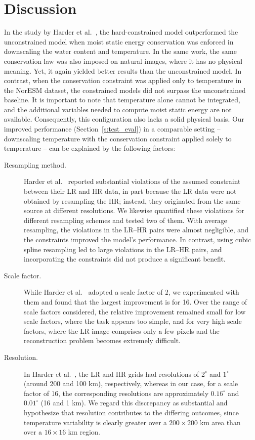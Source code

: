 \chapter{Discussion}

In the study by Harder et al.~\cite{Harder2023}, the hard-constrained model outperformed the unconstrained model when moist static energy conservation was enforced in downscaling the water content and temperature.
In the same work, the same conservation law was also imposed on natural images, where it has no physical meaning. 
Yet, it again yielded better results than the unconstrained model.
In contrast, when the conservation constraint was applied only to temperature in the NorESM dataset, the constrained models did not surpass the unconstrained baseline.
It is important to note that temperature alone cannot be integrated, and the additional variables needed to compute moist static energy are not available.
Consequently, this configuration also lacks a solid physical basis.
Our improved performance (Section~\ref{s:test_eval}) in a comparable setting -- downscaling temperature with the conservation constraint applied solely to temperature -- can be explained by the following factors:
\begin{description}
    \item[Resampling method.]  
    Harder et al.~\cite{Harder2023} reported substantial violations of the assumed constraint between their LR and HR data, in part because the LR data were not obtained by resampling the HR; instead, they originated from the same source at different resolutions.
    We likewise quantified these violations for different resampling schemes and tested two of them.
    With average resampling, the violations in the LR–HR pairs were almost negligible, and the constraints improved the model’s performance.
    In contrast, using cubic spline resampling led to large violations in the LR–HR pairs, and incorporating the constraints did not produce a significant benefit.
    \item[Scale factor.]
    While Harder et al.~\cite{Harder2023} adopted a scale factor of 2, we experimented with them and found that the largest improvement is for 16.
    Over the range of scale factors considered, the relative improvement remained small for low scale factors, where the task appears too simple, and for very high scale factors, where the LR image comprises only a few pixels and the reconstruction problem becomes extremely difficult.
    \newpage
    \item[Resolution.]
    In Harder et al.~\cite{Harder2023}, the LR and HR grids had resolutions of $2^\circ$ and $1^\circ$ (around 200 and 100 km), respectively, whereas in our case, for a scale factor of 16, the corresponding resolutions are approximately $0.16^\circ$ and $0.01^\circ$ (16 and 1 km).
    We regard this discrepancy as substantial and hypothesize that resolution contributes to the differing outcomes, since temperature variability is clearly greater over a $200\times 200$ km area than over a $16\times 16$ km region.
\end{description}

